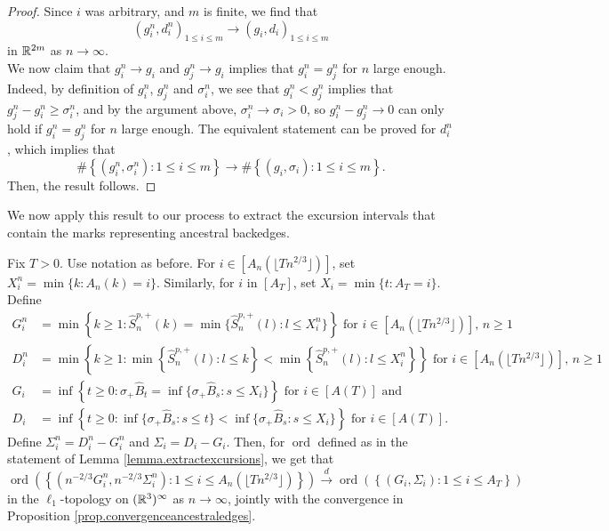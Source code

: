 \begin{proof}
Since $i$ was arbitrary, and $m$ is finite, we find that $$(g_i^n,d_i^n)_{1\leq i\leq m}\to (g_i,d_i)_{1\leq i\leq m}$$
in ${\mathbb R}^{2m}$ as $n\to \infty$. \\
We now claim that $g_i^n\to g_i$ and $g_j^n\to g_i$ implies that $g_i^n=g_j^n$ for $n$ large enough. Indeed, by definition of $g_i^n$, $g_j^n$ and $\sigma_i^n$, we see that $g_i^n<g_j^n$ implies that $g_j^n-g_i^n\geq \sigma_i^n$, and by the argument above, $\sigma_i^n\to \sigma_i>0$, so $g_i^n-g^n_j\to 0$ can only hold if $g_i^n=g_j^n$ for $n$ large enough. The equivalent statement can be proved for $d_i^n$, which implies that 
$$\#\left\{(g_i^n,\sigma_i^n):1\leq i \leq m\right\}\to \#\left\{(g_i,\sigma_i):1\leq i \leq m\right\}.$$
Then, the result follows.
\end{proof}

We now apply this result to our process to extract the excursion intervals that contain the marks representing ancestral backedges.
\begin{proposition}\label{prop.extractexcursions}
Fix $T>0$. Use notation as before. For $i\in \left[A_n\left(\lfloor T n^{2/3}\rfloor\right)\right]$, set $X_i^n=\min\{k:A_n(k)=i\}$. Similarly, for $i$ in $\left[A_T\right]$, set $X_i=\min\{t:A_T=i\}$. Define
\begin{align*}G_i^n&=\min\left\{k\geq 1:\hat{S}^{p,+}_n(k)=\min\{\hat{S}^{p,+}_n(l):l\leq X_i^n\}\right\}\text{ for }i\in \left[A_n\left(\lfloor T n^{2/3}\rfloor\right)\right]\text{, }n\geq 1\\
D_i^n&=\min\left\{k \geq 1: \min\left\{\hat{S}^{p,+}_n(l):l\leq k\right\} < \min\left\{\hat{S}^{p,+}_n(l):l\leq X_i^n\right\}\right\}\text{ for }i\in \left[A_n\left(\lfloor T n^{2/3}\rfloor\right)\right]\text{, }n\geq 1\\
G_i&=\inf\left\{t\geq 0:\sigma_+\hat{B}_t=\inf\{\sigma_+\hat{B}_s:s\leq X_i\}\right\}\text{ for }i\in \left[A(T )\right]\text{ and}\\
D_i&=\inf\left\{ t\geq 0: \inf\{\sigma_+\hat{B}_s:s\leq t\} < \inf\{\sigma_+\hat{B}_s:s\leq X_i\}\right\}\text{ for }i\in \left[A(T )\right].
\end{align*}
Define $\Sigma_i^n=D_i^n-G_i^n$ and $\Sigma_i=D_i-G_i$. Then, for $\operatorname{ord}$ defined as in the statement of Lemma \ref{lemma.extractexcursions}, we get that
$$\operatorname{ord}\left(\left\{\left(n^{-2/3}G_i^n,n^{-2/3}\Sigma_i^n\right):1\leq i \leq A_n\left(\lfloor T n^{2/3}\rfloor\right)\right\}\right)\overset{d}{\to} \operatorname{ord}\left(\left\{(G_i,\Sigma_i):1\leq i \leq A_T\right\}\right)$$
in the $\ell_1$-topology on $({\mathbb R}^3)^\infty$ as $n\to \infty$, jointly with the convergence in Proposition \ref{prop.convergenceancestraledges}. 
\end{proposition}
